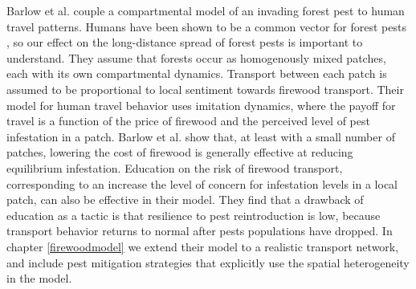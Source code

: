 Barlow et al. \cite{barlow2014modelling} couple a compartmental model of an invading forest pest to human travel patterns. Humans have been shown to be a common vector for forest pests \cite{buck2009hitchhiking,kolar2001progress,wilson2009something}, so our effect on the long-distance spread of forest pests is important to understand. They assume that forests occur as homogenously mixed patches, each with its own compartmental dynamics. Transport between each patch is assumed to be proportional to local sentiment towards firewood transport. Their model for human travel behavior uses imitation dynamics, where the payoff for travel is a function of the price of firewood and the perceived level of pest infestation in a patch. Barlow et al. show that, at least with a small number of patches, lowering the cost of firewood is generally effective at reducing equilibrium infestation. Education on the risk of firewood transport, corresponding to an increase the level of concern for infestation levels in a local patch, can also be effective in their model. They find that a drawback of education as a tactic is that resilience to pest reintroduction is low, because transport behavior returns to normal after pests populations have dropped. In chapter \ref{firewoodmodel} we extend their model to a realistic transport network, and include pest mitigation strategies that explicitly use the spatial heterogeneity in the model.  


